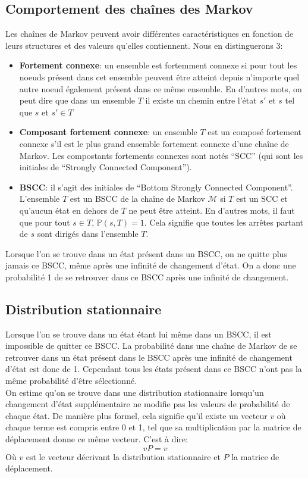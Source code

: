 \documentclass[letterpaper]{article}
\begin{document}
  \subsection{Comportement des chaînes des Markov}
    Les chaînes de Markov peuvent avoir différentes caractéristiques en fonction 
    de leurs structures et des valeurs qu'elles contiennent.  
    Nous en distinguerons 3:
    \begin{itemize}
     \item \textbf{Fortement connexe}: un ensemble est fortemment connexe si pour tout
      les noeuds présent dans cet ensemble peuvent être atteint depuis n'importe quel
      autre noeud également présent dans ce même ensemble.  En d'autres mots, on peut dire 
      que dans un ensemble $T$ il existe un chemin entre l'état $s'$ et $s$ tel que 
      $s$ et $s' \in T$
     \item \textbf{Composant fortement connexe}: un ensemble $T$ est un composé fortement
      connexe s'il est le plus grand ensemble fortement connexe d'une chaîne de Markov.  
      Les compostants fortements connexes sont notés ``SCC'' (qui sont les initiales de
      ``Strongly Connected Component'').
     \item \textbf{BSCC}: il s'agit des initiales de ``Bottom Strongly Connected Component''.
      L'ensemble $T$ est un BSCC de la chaîne de Markov $\mathcal{M}$ si $T$ est un SCC et
      qu'aucun état en dehors de $T$ ne peut être atteint.  En d'autres mots, il faut que
      pour tout $s \in T$, $\mathbb{P}(s, T) = 1$.  Cela signifie que toutes les 
      arrêtes partant de $s$ sont dirigés dans l'ensemble $T$.
    \end{itemize}
    Lorsque l'on se trouve dans un état présent dans un BSCC, on ne quitte plus jamais ce
    BSCC, même après une infinité de changement d'état.  On a donc une probabilité 1 de 
    se retrouver dans ce BSCC après une infinité de changement.
  
  \subsection{Distribution stationnaire}
    Lorsque l'on se trouve dans un état étant lui même dans un BSCC, il est impossible de 
    quitter ce BSCC.  La probabilité dans une chaîne de Markov de se retrouver dans un état
    présent dans le BSCC après une infinité de changement d'état est donc de 1.  Cependant
    tous les états présent dans ce BSCC n'ont pas la même probabilité d'être sélectionné.\\
    On estime qu'on se trouve dans une distribution stationnaire lorsqu'un changement d'état
    supplémentaire ne modifie pas les valeurs de probabilité de chaque état.  De manière plus 
    formel, cela signifie qu'il existe un vecteur $v$ où chaque terme est compris entre 0 et 1,
    tel que sa multiplication par la matrice de déplacement donne ce même vecteur.  C'est à dire:
    $$v P = v$$
    Où $v$ est le vecteur décrivant la distribution stationnaire et $P$ la matrice de déplacement.
    
\end{document}
